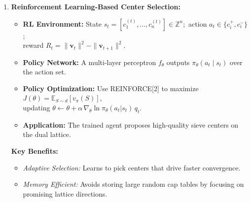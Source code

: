 \documentclass[25pt,
               a0paper,
               portrait]{tikzposter}
\begin{document}
\begin{columns}
{\begin{enumerate}
    \item \textbf{Reinforcement Learning-Based Center Selection:}
      \begin{itemize}
        \item \textbf{RL Environment:}
        State $s_t=[c_1^{(t)},\dots,c_n^{(t)}]\in\mathbb{Z}^n$;\ 
        action $a_t\in\{c_i^+,c_i^-\}$;\\
        reward $R_t=\|\mathbf v_t\|^2-\|\mathbf v_{t+1}\|^2$.
        \item \textbf{Policy Network:}
          A multi-layer perceptron $f_\theta$ outputs
          $\pi_\theta(a_t\mid s_t)$ over the action set.
        \item \textbf{Policy Optimization:}
          Use REINFORCE[2] to maximize
          $J(\theta)=\mathbb{E}_{S\sim d}[v_\pi(S)]$,\\ updating
          $\theta\leftarrow\theta+\alpha\,\nabla_\theta\ln\pi_\theta(a_t|s_t)\,q_t$.
        \item \textbf{Application:}
          The trained agent proposes high-quality sieve centers on the
          dual lattice.
      \end{itemize}
      \textbf{Key Benefits:}
      \begin{itemize}
        \item \emph{Adaptive Selection:} Learns to pick centers that drive
          faster convergence.
        \item \emph{Memory Efficient:} Avoids storing large random cap tables
          by focusing on promising lattice directions.
      \end{itemize}

  \end{enumerate}
}
    

\end{columns}
\end{document}

